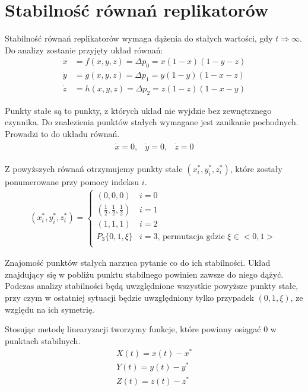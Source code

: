 \section{Stabilność równań replikatorów}
\label{sec:stab_repl}
Stabilność równań replikatorów wymaga dążenia do stałych wartości, gdy $t\Rightarrow \infty$. Do analizy zostanie przyjęty układ równań:
\begin{align}\label{eq:stab_uklad_analiza}
\dot{x} &= f(x,y,z) = \Delta p_0 = x(1-x)(1-y-z)\nonumber\\
\dot{y} &= g(x,y,z) = \Delta p_1 = y(1-y)(1-x-z)\\
\dot{z} &= h(x,y,z) = \Delta p_2 = z(1-z)(1-x-y)\nonumber
\end{align}

Punkty stałe są to punkty, z których układ nie wyjdzie bez zewnętrznego czynnika. Do znalezienia punktów stałych wymagane jest zanikanie pochodnych. Prowadzi to do układu równań.
\begin{align}
\begin{array}{ccc}
\dot{x} = 0, & \dot{y} = 0, & \dot{z} = 0
\end{array}
\end{align}

Z powyższych równań otrzymujemy punkty stałe $(x^*_i, y^*_i, z^*_i)$, które zostały ponumerowane przy pomocy indeksu $i$.
\begin{align}
(x^*_i, y^*_i, z^*_i) = \left\{
\begin{array}{ll}
(0,0,0)  & i=0 \\
(\frac{1}{2},\frac{1}{2},\frac{1}{2}) & i=1 \\
(1,1,1) & i=2 \\
P_3 \{0,1,\xi \} & i=3 \text{, permutacja gdzie }\xi \in <0,1>\\ 
\end{array}
\right.
\end{align}

Znajomość punktów stałych narzuca pytanie co do ich stabilności. Układ znajdujący się w pobliżu punktu stabilnego powinien zawsze do niego dążyć. Podczas analizy stabilności będą uwzględnione wszystkie powyższe punkty stałe, przy czym w ostatniej sytuacji będzie uwzględniony tylko przypadek $(0,1,\xi)$, ze względu na ich symetrię.

Stosując metodę linearyzacji tworzymy funkcje, które powinny osiągać 0 w punktach stabilnych.
\begin{align}\label{eq:nowe_f}
X(t)=x(t)-x^* \nonumber\\
Y(t)=y(t)-y^* \\
Z(t)=z(t)-z^* \nonumber
\end{align}

